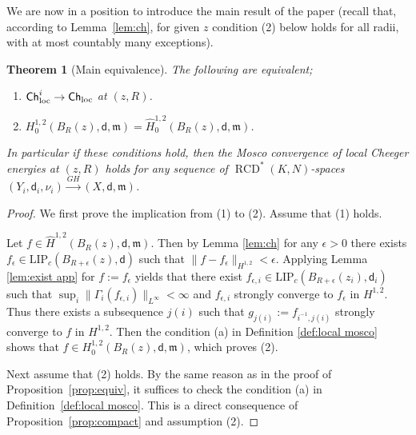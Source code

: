 \documentclass[a4paper,11pt,reqno]{article}
\numberwithin{equation}{section}
\theoremstyle{plain}
\newtheorem{theorem}{Theorem}[section]
\theoremstyle{definition}
\theoremstyle{remark}
\newcommand{\Ch}{{\sf Ch}}
\newcommand{\dist}{\mathsf{d}}
\newcommand{\meas}{\mathfrak{m}}
\DeclareMathOperator{\RCD}{RCD}
\begin{document}
{We are now in a position to introduce the main result of the paper (recall that, according to Lemma~\ref{lem:ch}, for given
$z$ condition (2) below holds for all radii, with at most countably many exceptions).

\begin{theorem}[Main equivalence]\label{thm:equiv}
The following are equivalent;
\begin{enumerate}
\item[(1)] $\Ch^i_{\mathrm{loc}} \to \Ch_{\mathrm{loc}}$ at $(z, R)$.
\item[(2)] $H^{1, 2}_0(B_R(z), \dist, \meas)=\hat{H}^{1, 2}_0(B_R(z), \dist, \meas)$.
\end{enumerate}
In particular if these conditions hold, then the Mosco convergence of local Cheeger energies at $(z, R)$ holds for any
sequence of $\RCD^*(K,N)$-spaces $(Y_i, \dist_i, \nu_i) \stackrel{GH}{\to} (X, \dist, \meas)$. %
\end{theorem}
\begin{proof}
We first prove the implication from (1) to (2). Assume that (1) holds.

Let $f \in \hat{H}^{1, 2}(B_R(z), \dist, \meas)$. Then by Lemma \ref{lem:ch} for any $\epsilon>0$ there exists $f_{\epsilon} \in \mathrm{LIP}_c(B_{R+\epsilon}(z), \dist)$ such that $\|f-f_{\epsilon}\|_{H^{1, 2}}<\epsilon$.
Applying Lemma \ref{lem:exist app} for $f:=f_{\epsilon}$ yields that there exist $f_{\epsilon, i} \in \mathrm{LIP}_c(B_{R+\epsilon}(z_i), \dist_i)$ such that $\sup_i\|\Gamma_i (f_{\epsilon, i})\|_{L^{\infty}}<\infty$ and $f_{\epsilon, i}$ strongly converge to $f_{\epsilon}$ in $H^{1, 2}$.
Thus there exists a subsequence $j(i)$ such that $g_{j(i)}:=f_{i^{-1}, j(i)}$ strongly converge to $f$ in $H^{1, 2}$.
Then the condition (a) in Definition \ref{def:local mosco} shows that $f \in H^{1, 2}_0(B_R(z), \dist, \meas)$, which proves (2).

Next assume that (2) holds. By the same reason as in the proof of Proposition~\ref{prop:equiv}, 
it suffices to check the condition (a) in Definition~\ref{def:local mosco}.
This is a direct consequence of Proposition~\ref{prop:compact} and assumption (2).
\end{proof}

}
\end{document}
